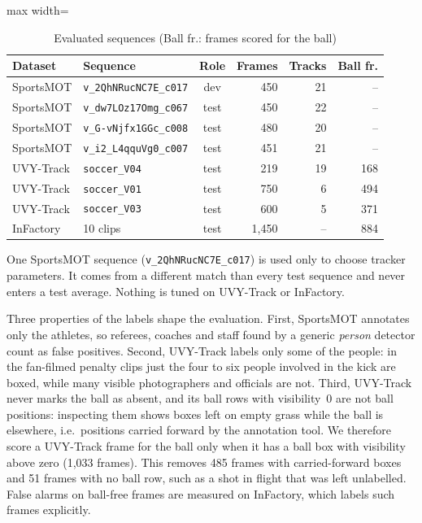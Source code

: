 \documentclass[conference]{IEEEtran}
\begin{document}
\begin{table}[!htbp]
\caption{Evaluated sequences (Ball fr.: frames scored for the ball)}
\label{tab:sequences}
\centering
\footnotesize
\begin{adjustbox}{max width=\columnwidth}
\begin{tabular}{@{}llcrrr@{}}
\toprule
Dataset & Sequence & Role & Frames & Tracks & Ball fr. \\
\midrule
SportsMOT & \texttt{v\_2QhNRucNC7E\_c017} & dev & 450 & 21 & -- \\
SportsMOT & \texttt{v\_dw7LOz17Omg\_c067} & test & 450 & 22 & -- \\
SportsMOT & \texttt{v\_G-vNjfx1GGc\_c008} & test & 480 & 20 & -- \\
SportsMOT & \texttt{v\_i2\_L4qquVg0\_c007} & test & 451 & 21 & -- \\
UVY-Track & \texttt{soccer\_V04} & test & 219 & 19 & 168 \\
UVY-Track & \texttt{soccer\_V01} & test & 750 & 6 & 494 \\
UVY-Track & \texttt{soccer\_V03} & test & 600 & 5 & 371 \\
InFactory & 10 clips & test & 1{,}450 & -- & 884 \\
\bottomrule
\end{tabular}
\end{adjustbox}
\end{table}

One SportsMOT sequence (\texttt{v\_2QhNRucNC7E\_c017}) is used only to choose
tracker parameters. It comes from a different match than every test sequence and
never enters a test average. Nothing is tuned on UVY-Track or InFactory.

Three properties of the labels shape the evaluation. First, SportsMOT annotates
only the athletes, so referees, coaches and staff found by a generic
\emph{person} detector count as false positives. Second, UVY-Track labels only
some of the people: in the fan-filmed penalty clips just the four to six people
involved in the kick are boxed, while many visible photographers and officials
are not. Third, UVY-Track never marks the ball as absent, and its ball rows with
visibility~0 are not ball positions: inspecting them shows boxes left on empty
grass while the ball is elsewhere, i.e.\ positions carried forward by the
annotation tool. We therefore score a UVY-Track frame for the ball only when it
has a ball box with visibility above zero (1{,}033 frames). This removes
485 frames with carried-forward boxes and 51 frames with no
ball row, such as a shot in flight that was left unlabelled. False alarms on
ball-free frames are measured on InFactory, which labels such frames explicitly.
\end{document}
